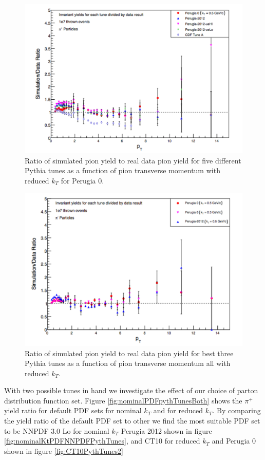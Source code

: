 \documentclass[abstract = on,listof=totoc, bibliography=totoc]{scrreprt}
\begin{document}
\begin{figure}
\begin{center}
\includegraphics[width = .75\textwidth]{pythiaTunesLowKt}
\caption[]{Ratio of simulated pion yield to real data pion yield for five different Pythia tunes as a function of pion transverse momentum with reduced $k_T$ for Perugia 0.}
\label{fig:pythTunesLowKt}
\end{center}
\end{figure}

\begin{figure}
\begin{center}
\includegraphics[width = .75\textwidth]{multLowKt}
\caption[]{Ratio of simulated pion yield to real data pion yield for best three Pythia tunes as a function of pion transverse momentum all with reduced $k_T$.}
\label{fig:multLowKt}
\end{center}
\end{figure}

With two possible tunes in hand we investigate the effect of our choice of parton distribution function set. Figure \ref{fig:nominalPDFpythTunesBoth} shows the $\pi^+$ yield ratio for default PDF sets for nominal $k_T$ and for reduced $k_T$. By comparing the yield ratio of the default PDF set to other we find the most suitable PDF set to be NNPDF 3.0 Lo for nominal $k_T$ Perugia 2012 shown in figure \ref{fig:nominalKtPDFNNPDFPythTunes}, and CT10 for reduced $k_T$ and Perugia 0 shown in figure \ref{fig:CT10PythTunes2} 
\end{document}
